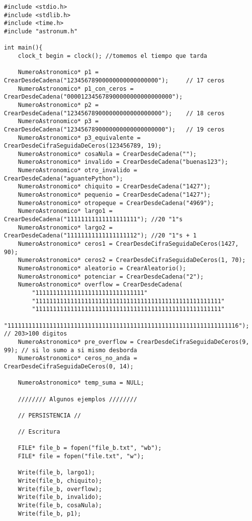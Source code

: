 \documentclass[a4paper, 12pt]{article}
\begin{document}
\begin{lstlisting}[style=C]
#include <stdio.h>
#include <stdlib.h>
#include <time.h>
#include "astronum.h"

int main(){
    clock_t begin = clock(); //tomemos el tiempo que tarda

    NumeroAstronomico* p1 = CrearDesdeCadena("12345678900000000000000000");     // 17 ceros
    NumeroAstronomico* p1_con_ceros = CrearDesdeCadena("000012345678900000000000000000");
    NumeroAstronomico* p2 = CrearDesdeCadena("123456789000000000000000000");    // 18 ceros
    NumeroAstronomico* p3 = CrearDesdeCadena("1234567890000000000000000000");   // 19 ceros
    NumeroAstronomico* p3_equivalente = CrearDesdeCifraSeguidaDeCeros(123456789, 19);
    NumeroAstronomico* cosaNula = CrearDesdeCadena("");
    NumeroAstronomico* invalido = CrearDesdeCadena("buenas123");
    NumeroAstronomico* otro_invalido = CrearDesdeCadena("aguantePython");
    NumeroAstronomico* chiquito = CrearDesdeCadena("1427");
    NumeroAstronomico* pequenio = CrearDesdeCadena("1427");
    NumeroAstronomico* otropeque = CrearDesdeCadena("4969");
    NumeroAstronomico* largo1 = CrearDesdeCadena("11111111111111111111"); //20 "1"s
    NumeroAstronomico* largo2 = CrearDesdeCadena("11111111111111111112"); //20 "1"s + 1
    NumeroAstronomico* ceros1 = CrearDesdeCifraSeguidaDeCeros(1427, 90);
    NumeroAstronomico* ceros2 = CrearDesdeCifraSeguidaDeCeros(1, 70);
    NumeroAstronomico* aleatorio = CrearAleatorio();
    NumeroAstronomico* potenciar = CrearDesdeCadena("2");
    NumeroAstronomico* overflow = CrearDesdeCadena(
        "1111111111111111111111111111111"
        "11111111111111111111111111111111111111111111111111111"
        "11111111111111111111111111111111111111111111111111111"
        "111111111111111111111111111111111111111111111111111111111111111116"); // 203>100 digitos
    NumeroAstronomico* pre_overflow = CrearDesdeCifraSeguidaDeCeros(9, 99); // si lo sumo a si mismo desborda
    NumeroAstronomico* ceros_no_anda = CrearDesdeCifraSeguidaDeCeros(0, 14);

    NumeroAstronomico* temp_suma = NULL;

    //////// Algunos ejemplos ////////

    // PERSISTENCIA //

    // Escritura

    FILE* file_b = fopen("file_b.txt", "wb");
    FILE* file = fopen("file.txt", "w");

    Write(file_b, largo1);
    Write(file_b, chiquito);
    Write(file_b, overflow);
    Write(file_b, invalido);
    Write(file_b, cosaNula);
    Write(file_b, p1);


\end{lstlisting}
\end{document}
